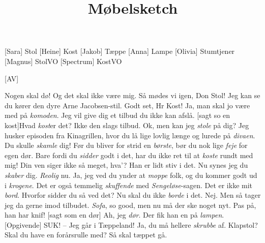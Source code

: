 \documentclass[a4paper,11pt]{article}
\title{Møbelsketch}
\begin{document}
\maketitle

\begin{roles}
    [Sara] Stol
    [Heine] Kost
    [Jakob] Tæppe
    [Anna] Lampe
    [Olivia] Stumtjener
    [Magnus] StolVO
    [Spectrum] KostVO
\end{roles}

\begin{props}
    [AV]
\end{props}


\begin{sketch}


 Nogen skal dø! Og det skal ikke være mig. 
 Så mødes vi igen, Don Stol! Jeg kan se du kører den dyre Arne Jacobsen-stil.
 Godt set, Hr Kost! Ja, man skal jo være med på \emph{komoden}. Jeg vil give dig et tilbud du ikke kan afslå.
[sagt so en kost]Hvad \emph{kost}er det?
Ikke den slags tilbud.
Ok, men kan jeg \emph{stole} på dig? Jeg husker episoden fra Kinagrillen, hvor du lå lige lovlig længe og lurede på \emph{divaen}. Du skulle \emph{skamle }dig!
Før du bliver for strid en \emph{børste}, bør du nok lige \emph{feje} for egen dør.
Bare fordi du \emph{sidder} godt i det, har du ikke ret til at \emph{koste} rundt med mig!
Din ven siger ikke så meget, hva’? Han er lidt stiv i det.
Nu synes jeg du \emph{skaber} dig.
\emph{Reolig} nu. Ja, jeg ved du ynder at \emph{moppe} folk, og du kommer godt ud i \emph{krogene}.
Det er også temmelig \emph{skuffende} med \emph{Sengeløse}-sagen.
Det er ikke mit \emph{bord}.
Hvorfor sidder du så ved det?
Nu skal du ikke \emph{borde} i det.
Nej. Men så tager jeg da gerne imod tilbudet.
\emph{Sofa}, so good, men nu må der ske noget nyt.
Pas på, han har knif!
[sagt som en dør] Ah, jeg \emph{dør}.
Der fik han en på \emph{lampen}.
[Opgivende] SUK! -- Jeg går i Tæppeland!
Ja, du må hellere \emph{skrubbe} af.
Klapstol?
Skal du have en forårsrulle med? 
Så skal tæppet gå.


\end{sketch}
\end{document}
